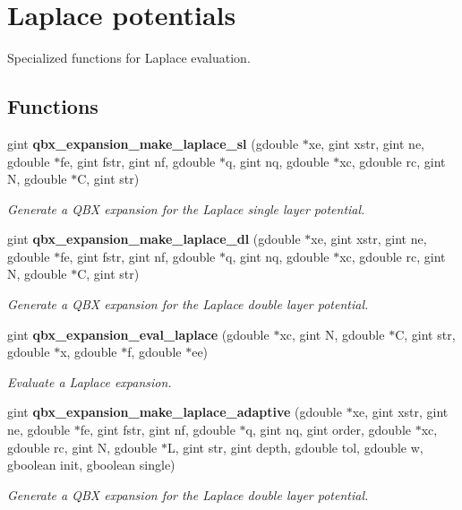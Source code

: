 \section{Laplace potentials}
\label{group__laplace}


Specialized functions for Laplace evaluation.  


\subsection*{Functions}
\begin{DoxyCompactItemize}
\item 
gint {\bf qbx\+\_\+expansion\+\_\+make\+\_\+laplace\+\_\+sl} (gdouble $\ast$xe, gint xstr, gint ne, gdouble $\ast$fe, gint fstr, gint nf, gdouble $\ast$q, gint nq, gdouble $\ast$xc, gdouble rc, gint N, gdouble $\ast$C, gint str)
\begin{DoxyCompactList}\small\item\em Generate a Q\+B\+X expansion for the Laplace single layer potential. \end{DoxyCompactList}\item 
gint {\bf qbx\+\_\+expansion\+\_\+make\+\_\+laplace\+\_\+dl} (gdouble $\ast$xe, gint xstr, gint ne, gdouble $\ast$fe, gint fstr, gint nf, gdouble $\ast$q, gint nq, gdouble $\ast$xc, gdouble rc, gint N, gdouble $\ast$C, gint str)
\begin{DoxyCompactList}\small\item\em Generate a Q\+B\+X expansion for the Laplace double layer potential. \end{DoxyCompactList}\item 
gint {\bf qbx\+\_\+expansion\+\_\+eval\+\_\+laplace} (gdouble $\ast$xc, gint N, gdouble $\ast$C, gint str, gdouble $\ast$x, gdouble $\ast$f, gdouble $\ast$ee)
\begin{DoxyCompactList}\small\item\em Evaluate a Laplace expansion. \end{DoxyCompactList}\item 
gint {\bf qbx\+\_\+expansion\+\_\+make\+\_\+laplace\+\_\+adaptive} (gdouble $\ast$xe, gint xstr, gint ne, gdouble $\ast$fe, gint fstr, gint nf, gdouble $\ast$q, gint nq, gint order, gdouble $\ast$xc, gdouble rc, gint N, gdouble $\ast$L, gint str, gint depth, gdouble tol, gdouble w, gboolean init, gboolean single)
\begin{DoxyCompactList}\small\item\em Generate a Q\+B\+X expansion for the Laplace double layer potential. \end{DoxyCompactList}\item 

\end{DoxyCompactItemize}
